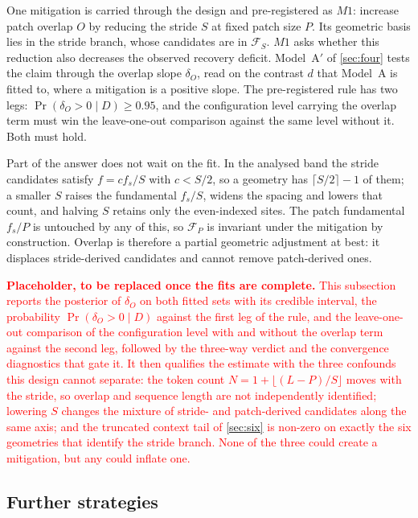 One mitigation is carried through the design and pre-registered as $M1$: increase patch overlap $O$ by reducing the stride $S$ at fixed patch size $P$. Its geometric basis lies in the stride branch, whose candidates are in $\mathcal{F}_{S}$. $M1$ asks whether this reduction also decreases the observed recovery deficit. Model~A$'$ of \autoref{sec:four} tests the claim through the overlap slope $\delta_O$, read on the contrast $d$ that Model~A is fitted to, where a mitigation is a positive slope. The pre-registered rule has two legs: $\Pr(\delta_O>0\mid D)\geq0.95$, and the configuration level carrying the overlap term must win the leave-one-out comparison against the same level without it. Both must hold.

Part of the answer does not wait on the fit. In the analysed band the stride candidates satisfy $f=cf_s/S$ with $c<S/2$, so a geometry has $\lceil S/2\rceil-1$ of them; a smaller $S$ raises the fundamental $f_s/S$, widens the spacing and lowers that count, and halving $S$ retains only the even-indexed sites. The patch fundamental $f_s/P$ is untouched by any of this, so $\mathcal{F}_{P}$ is invariant under the mitigation by construction. Overlap is therefore a partial geometric adjustment at best: it displaces stride-derived candidates and cannot remove patch-derived ones.

\textcolor{red}{\textbf{Placeholder, to be replaced once the fits are complete.} This subsection reports the posterior of $\delta_O$ on both fitted sets with its credible interval, the probability $\Pr(\delta_O>0\mid D)$ against the first leg of the rule, and the leave-one-out comparison of the configuration level with and without the overlap term against the second leg, followed by the three-way verdict and the convergence diagnostics that gate it. It then qualifies the estimate with the three confounds this design cannot separate: the token count $N=1+\lfloor(L-P)/S\rfloor$ moves with the stride, so overlap and sequence length are not independently identified; lowering $S$ changes the mixture of stride- and patch-derived candidates along the same axis; and the truncated context tail of \autoref{sec:six} is non-zero on exactly the six geometries that identify the stride branch. None of the three could create a mitigation, but any could inflate one.}

\subsection*{Further strategies}

